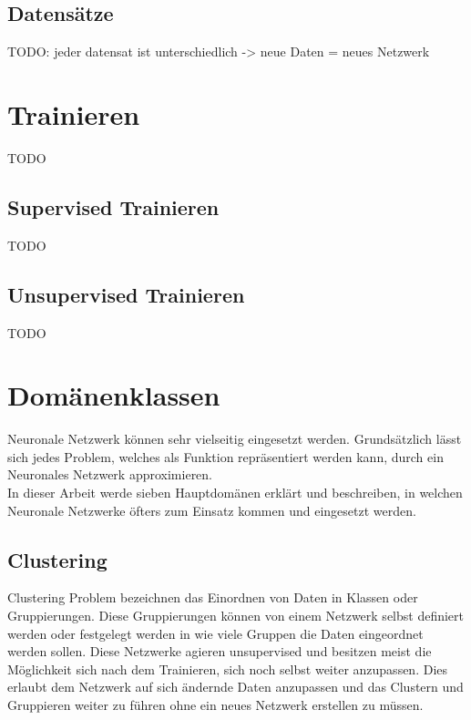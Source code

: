 \subsection{Datensätze}

TODO: jeder datensat ist unterschiedlich -> neue Daten = neues Netzwerk

\section{Trainieren}

TODO

\subsection{Supervised Trainieren}

TODO

\subsection{Unsupervised Trainieren}

TODO

\section{Domänenklassen}
\label{sec:Domänenklassen}

Neuronale Netzwerk können sehr vielseitig eingesetzt werden. 
Grundsätzlich lässt sich jedes Problem, welches als Funktion repräsentiert werden kann, durch ein Neuronales Netzwerk approximieren. \\

In dieser Arbeit werde sieben Hauptdomänen erklärt und beschreiben, in welchen Neuronale Netzwerke öfters zum Einsatz kommen und eingesetzt werden.

\subsection{Clustering}
\label{subsec:Clustering}

Clustering Problem bezeichnen das Einordnen von Daten in Klassen oder Gruppierungen. 
Diese Gruppierungen können von einem Netzwerk selbst definiert werden oder festgelegt werden in wie viele Gruppen die Daten eingeordnet werden sollen. 
Diese Netzwerke agieren unsupervised und besitzen meist die Möglichkeit sich nach dem Trainieren, sich noch selbst weiter anzupassen. 
Dies erlaubt dem Netzwerk auf sich ändernde Daten anzupassen und das Clustern und Gruppieren weiter zu führen ohne ein neues Netzwerk erstellen zu müssen.

